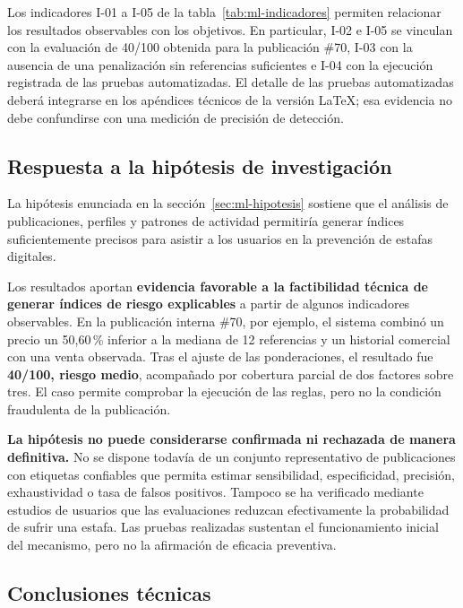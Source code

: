 Los indicadores I-01 a I-05 de la tabla~\ref{tab:ml-indicadores} permiten relacionar los resultados observables con los objetivos. En particular, I-02 e I-05 se vinculan con la evaluación de 40/100 obtenida para la publicación \#70, I-03 con la ausencia de una penalización sin referencias suficientes e I-04 con la ejecución registrada de las pruebas automatizadas. El detalle de las pruebas automatizadas deberá integrarse en los apéndices técnicos de la versión LaTeX; esa evidencia no debe confundirse con una medición de precisión de detección.

\subsection{Respuesta a la hipótesis de investigación}\label{subsec:ml-respuesta-hipotesis}

La hipótesis enunciada en la sección~\ref{sec:ml-hipotesis} sostiene que el análisis de publicaciones, perfiles y patrones de actividad permitiría generar índices suficientemente precisos para asistir a los usuarios en la prevención de estafas digitales.

Los resultados aportan \textbf{evidencia favorable a la factibilidad técnica de generar índices de riesgo explicables} a partir de algunos indicadores observables. En la publicación interna \#70, por ejemplo, el sistema combinó un precio un 50,60\,\% inferior a la mediana de 12 referencias y un historial comercial con una venta observada. Tras el ajuste de las ponderaciones, el resultado fue \textbf{40/100, riesgo medio}, acompañado por cobertura parcial de dos factores sobre tres. El caso permite comprobar la ejecución de las reglas, pero no la condición fraudulenta de la publicación.

\textbf{La hipótesis no puede considerarse confirmada ni rechazada de manera definitiva.} No se dispone todavía de un conjunto representativo de publicaciones con etiquetas confiables que permita estimar sensibilidad, especificidad, precisión, exhaustividad o tasa de falsos positivos. Tampoco se ha verificado mediante estudios de usuarios que las evaluaciones reduzcan efectivamente la probabilidad de sufrir una estafa. Las pruebas realizadas sustentan el funcionamiento inicial del mecanismo, pero no la afirmación de eficacia preventiva.

\subsection{Conclusiones técnicas}\label{subsec:ml-conclusiones-tecnicas}

